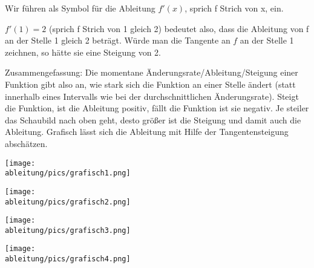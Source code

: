 \begin{tcolorbox}

    \bigskip

	\textcolor{loestc}{Wir führen als Symbol für die Ableitung \(f'(x)\), sprich f Strich von x, ein.}

	\textcolor{loestc}{\(f'(1)=2\) (sprich f Strich von 1 gleich 2) bedeutet also, dass die Ableitung von f an der Stelle 1 gleich 2 beträgt. Würde man die Tangente an \(f\) an der Stelle 1 zeichnen, so hätte sie eine Steigung von 2.}

    \bigskip

\end{tcolorbox}
Zusammengefassung: Die momentane Änderungsrate/Ableitung/Steigung einer Funktion gibt also an, wie stark sich die Funktion an einer Stelle ändert (statt innerhalb eines Intervalls wie bei der durchschnittlichen Änderungsrate). Steigt die Funktion, ist die Ableitung positiv, fällt die Funktion ist sie negativ. Je steiler das Schaubild nach oben geht, desto größer ist die Steigung und damit auch die Ableitung. Grafisch lässt sich die Ableitung mit Hilfe der Tangentensteigung abschätzen.
\newpage
\begin{Exercise}[title={\raggedright Schätze jeweils die Ableitung an den Stellen -2, 0, 1 und 3 ab.}, label=grafischABlA1]

    \begin{minipage}{\textwidth}
		\begin{minipage}{\textwidth}
			\begin{minipage}{0.5\textwidth}
				\centering\texttt{[image: \\ableitung/pics/grafisch1.png]}
			\end{minipage}%
			\begin{minipage}{0.5\textwidth}
				\centering\texttt{[image: \\ableitung/pics/grafisch2.png]}
			\end{minipage}%
		\end{minipage}%

        \bigskip

		\begin{minipage}{\textwidth}
			\begin{minipage}{0.5\textwidth}
				\centering\texttt{[image: \\ableitung/pics/grafisch3.png]}
			\end{minipage}%
			\begin{minipage}{0.5\textwidth}
				\centering\texttt{[image: \\ableitung/pics/grafisch4.png]}
			\end{minipage}%
		\end{minipage}%
    \end{minipage}
\end{Exercise}

